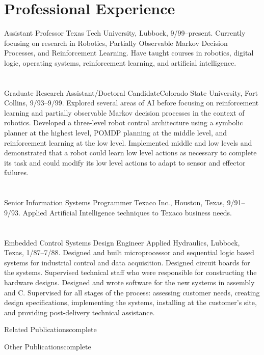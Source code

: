 \documentclass[11pt]{resume}
\begin{document}
\section{Professional Experience}
{Assistant Professor} {Texas Tech University, Lubbock, 9/99--present.
  Currently focusing on research in Robotics, Partially Observable Markov
  Decision Processes, and Reinforcement Learning.  Have taught courses in
  robotics, digital logic, operating systems, reinforcement learning, and
  artificial intelligence.  }

\section{}
{Graduate Research Assistant/Doctoral Candidate}{Colorado State University,
  Fort Collins, 9/93--9/99. Explored several areas of AI before focusing on
  reinforcement learning and partially observable Markov decision processes
  in the context of robotics. Developed a three-level robot control
  architecture using a symbolic planner at the highest level, POMDP planning
  at the middle level, and reinforcement learning at the low level.
  Implemented middle and low levels and demonstrated that a robot could
  learn low level actions as necessary to complete its task and could modify
  its low level actions to adapt to sensor and effector failures.  }

\section{}
{Senior Information Systems Programmer} {Texaco Inc., Houston, Texas,
  9/91--9/93. Applied Artificial Intelligence techniques to Texaco business
  needs.}
   
\section{}{Embedded Control Systems Design Engineer} {Applied
  Hydraulics, Lubbock, Texas, 1/87--7/88. Designed and built microprocessor
  and sequential logic based systems for industrial control and data
  acquisition.  Designed circuit boards for the systems.  Supervised
  technical staff who were responsible for constructing the hardware
  designs.  Designed and wrote software for the new systems in assembly and
  C.  Supervised for all stages of the process: assessing customer needs,
  creating design specifications, implementing the systems, installing at
  the customer's site, and providing post-delivery technical assistance.}


\newcommand{\bibfile}{complete}

\begin{citations}{Related Publications}{\bibfile}
\nocite{Moore:Quasny:Pyeatt:Sinzinger:C01b}
\nocite{Pyeatt:Howe:J00}
\nocite{Pyeatt:Howe:C01a}
\nocite{Pyeatt:Howe:C99a}
\nocite{Pyeatt:Howe:C98b}
\end{citations}

\begin{citations}{Other Publications}{\bibfile}
\nocite{Pyeatt:Howe:C99c}
\nocite{Howe:Pyeatt:C96}
\nocite{Gruau:Whitley:Pyeatt:C96}
\nocite{Whitley:Mathias:Pyeatt:C95}
\nocite{Whitley:Gruau:Pyeatt:C95}
\end{citations}
\end{document}

